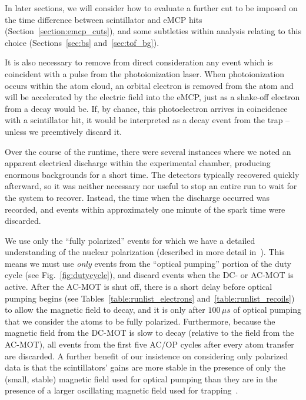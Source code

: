 In later sections, we will consider how to evaluate a further cut to be imposed on the time difference between scintillator and eMCP hits (Section~\ref{section:emcp_cuts}), and some subtleties within analysis relating to this choice (Sections~\ref{sec:bs} and~\ref{sec:tof_bg}).

It is also necessary to remove from direct consideration any event which is coincident with a pulse from the photoionization laser.  When photoionization occurs within the atom cloud, an orbital electron is removed from the atom and will be accelerated by the electric field into the eMCP, just as a shake-off electron from a decay would be.  If, by chance, this photoelectron arrives in coincidence with a scintillator hit, it would be interpreted as a decay event from the trap -- unless we preemtively discard it.  

Over the course of the runtime, there were several instances where we noted an apparent electrical discharge within the experimental chamber, producing enormous backgrounds for a short time.  The detectors typically recovered quickly afterward, so it was neither necessary nor useful to stop an entire run to wait for the system to recover.  Instead, the time when the discharge occurred was recorded, and events within approximately one minute of the spark time were discarded.  

We use only the ``fully polarized'' events for which we have a detailed understanding of the nuclear polarization (described in more detail in~\cite{ben_OP}).  This means we must use \emph{only} events from the ``optical pumping'' portion of the duty cycle (see Fig.~\ref{fig:dutycycle}), and discard events when the DC- or AC-MOT is active.  After the AC-MOT is shut off, there is a short delay before optical pumping begins (see Tables~\ref{table:runlist_electrons} and~\ref{table:runlist_recoils}) to allow the magnetic field to decay, and it is only after $100\,\mu s$ of optical pumping that we consider the atoms to be fully polarized.  Furthermore, because the magnetic field from the DC-MOT is slow to decay (relative to the field from the AC-MOT), all events from the first five AC/OP cycles after every atom transfer are discarded.  A further benefit of our insistence on considering only polarized data is that the scintillators' gains are more stable in the presence of only the (small, stable) magnetic field used for optical pumping than they are in the presence of a larger oscillating magnetic field used for trapping~\cite{ben_thesis}.

